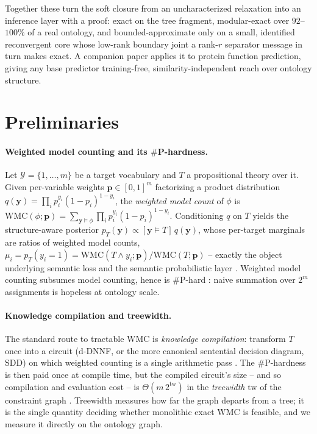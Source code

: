 \documentclass[anon]{nesy2026}
\newcommand{\WMC}{\ensuremath{\mathrm{WMC}}}
\newcommand{\tw}{\ensuremath{\mathrm{tw}}}
\newcommand{\bC}[1]{\boldsymbol{#1}}
\begin{document}
Together these turn the soft closure from an uncharacterized relaxation into an inference
layer with a proof: exact on the tree fragment, modular-exact over
$92$--$100\%$ of a real ontology, and bounded-approximate only on a small, identified
reconvergent core whose low-rank boundary joint a rank-$r$ separator message in turn makes exact. A companion paper applies it to protein function prediction, giving any
base predictor training-free, similarity-independent reach over ontology structure.

\section{Preliminaries}\label{sec:prelim}

\paragraph{Weighted model counting and its $\#$P-hardness.}
Let $\mathcal{Y}=\{1,\dots,m\}$ be a target vocabulary and $T$ a propositional theory over it. Given per-variable weights $\bC p\in[0,1]^m$ factorizing a product distribution $q(\bC y)=\prod_i p_i^{y_i}(1-p_i)^{1-y_i}$, the \emph{weighted model count} of $\phi$ is $\WMC(\phi;\bC p)=\sum_{\bC y\models\phi}\prod_i p_i^{y_i}(1-p_i)^{1-y_i}$. Conditioning $q$ on $T$ yields the structure-aware posterior $p_T(\bC y)\propto[\bC y\models T]\,q(\bC y)$, whose per-target marginals are ratios of weighted model counts, $\mu_i=p_T(y_i{=}1)=\WMC(T\wedge y_i;\bC p)/\WMC(T;\bC p)$ -- exactly the object underlying semantic loss and the semantic probabilistic layer \citep{xu2018semanticloss,ahmed2022spl}. Weighted model counting subsumes model counting, hence is $\#$P-hard \citep{chavira2008wmc}: naive summation over $2^m$ assignments is hopeless at ontology scale.

\paragraph{Knowledge compilation and treewidth.}
The standard route to tractable $\WMC$ is \emph{knowledge compilation}: transform $T$ once into a circuit (d-DNNF, or the more canonical sentential decision diagram, SDD) on which weighted counting is a single arithmetic pass \citep{darwiche2002kcmap,darwiche2002factoring,darwiche2011sdd}. The $\#$P-hardness is then paid once at compile time, but the compiled circuit's size -- and so compilation and evaluation cost -- is $\Theta(m\,2^{\tw})$ in the \emph{treewidth} $\tw$ of the constraint graph \citep{darwiche2011sdd,bodlaender1993treewidth}. Treewidth measures how far the graph departs from a tree; it is the single quantity deciding whether monolithic exact $\WMC$ is feasible, and we measure it directly on the ontology graph.
\end{document}
